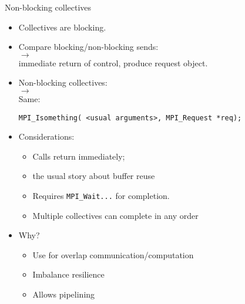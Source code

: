 
\begin{numberedframe}{Non-blocking collectives}
  \label{sl:coll-nonblock-intro}
  \begin{itemize}
  \item Collectives are blocking.
  \item Compare blocking/non-blocking sends:\\
     $\rightarrow$ \\
    immediate return of control, produce request object.
  \item Non-blocking collectives:\\
     $\rightarrow$ \\
    Same: 
\begin{lstlisting}
MPI_Isomething( <usual arguments>, MPI_Request *req);
\end{lstlisting}
\item Considerations:
  \begin{itemize}
  \item
    Calls return immediately;
  \item the usual story about buffer reuse
  \item Requires \lstinline{MPI_Wait}\texttt{...} for completion.
  \item Multiple collectives can complete in any order
  \end{itemize}
\item Why?
  \begin{itemize}
  \item Use for overlap communication/computation
  \item Imbalance resilience
  \item Allows pipelining
  \end{itemize}
  \end{itemize}
\end{numberedframe}


